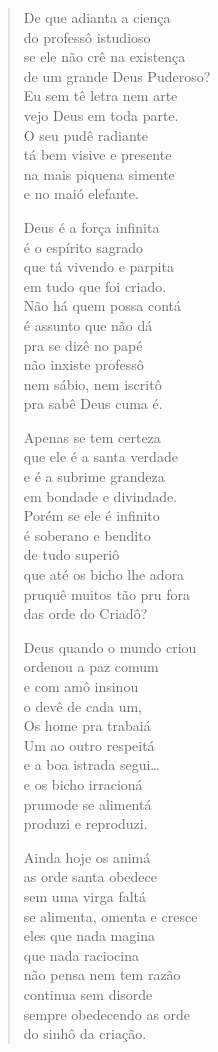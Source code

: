 \begin{verse}
De que adianta a ciença\\
do professô istudioso\\
se ele não crê na existença\\
de um grande Deus Puderoso?\\
Eu sem tê letra nem arte\\
vejo Deus em toda parte.\\
O seu pudê radiante\\
tá bem visive e presente\\
na mais piquena simente\\
e no maió elefante.

Deus é a força infinita\\
é o espírito sagrado\\
que tá vivendo e parpita\\
em tudo que foi criado.\\
Não há quem possa contá\\
é assunto que não dá\\
pra se dizê no papé\\
não inxiste professô\\
nem sábio, nem iscritô\\
pra sabê Deus cuma é.

Apenas se tem certeza\\
que ele é a santa verdade\\
e é a subrime grandeza\\
em bondade e divindade.\\
Porém se ele é infinito\\
é soberano e bendito\\
de tudo superiô\\
que até os bicho lhe adora\\
pruquê muitos tão pru fora\\
das orde do Criadô?

Deus quando o mundo criou\\
ordenou a paz comum\\
e com amô insinou\\
o devê de cada um,\\
Os home pra trabaiá\\
Um ao outro respeitá\\
e a boa istrada segui\ldots{}\\
e os bicho irracioná\\
prumode se alimentá\\
produzi e reproduzi.

Ainda hoje os animá\\
as orde santa obedece\\
sem uma virga faltá\\
se alimenta, omenta e cresce\\
eles que nada magina\\
que nada raciocina\\
não pensa nem tem razão\\
continua sem disorde\\
sempre obedecendo as orde\\
do sinhô da criação.


\end{verse}
